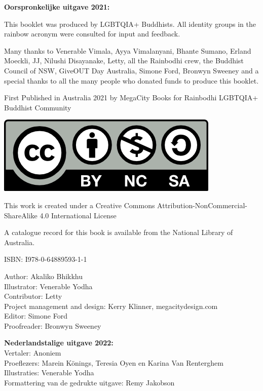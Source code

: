 \documentclass[12pt,openany]{book}
\begin{document}
\medskip

{\footnotesize
\begin{center}
\noindent \textbf{Oorspronkelijke uitgave 2021:} 

This booklet was produced by LGBTQIA+ Buddhists. All identity groups in the rainbow acronym were consulted for input and feedback.

\noindent Many thanks to Venerable Vimala, Ayya Vimalanyani, Bhante Sumano, Erland Moeckli, JJ, Nilushi Disayanake, Letty, all the Rainbodhi crew, the Buddhist Council of NSW, GiveOUT Day Australia, Simone Ford, Bronwyn Sweeney and a special thanks to all the many people who donated funds to produce this booklet.

\medskip

\noindent First Published in Australia 2021 by MegaCity Books for Rainbodhi LGBTQIA+ Buddhist Community

\smallskip

\includegraphics{by-nc-sa}

\noindent This work is created under a Creative Commons Attribution-NonCommercial-ShareAlike 4.0 International License

\noindent A catalogue record for this book is available from the National Library of Australia.

\medskip

\noindent ISBN: I978-0-64889593-1-1

\medskip

Author: Akaliko Bhikkhu \\
Illustrator: Venerable Yodha \\
Contributor: Letty \\
Project management and design: Kerry Klinner, megacitydesign.com \\
Editor: Simone Ford \\
Proofreader: Bronwyn Sweeney

\bigskip

\textbf{Nederlandstalige uitgave 2022:}  \\
Vertaler: Anoniem \\
Proeflezers: Marein Könings, Teresia Oyen en Karina Van Renterghem \\
Illustraties: Venerable Yodha \\
Formattering van de gedrukte uitgave: Remy Jakobson
\end{center}
}
\end{document}
